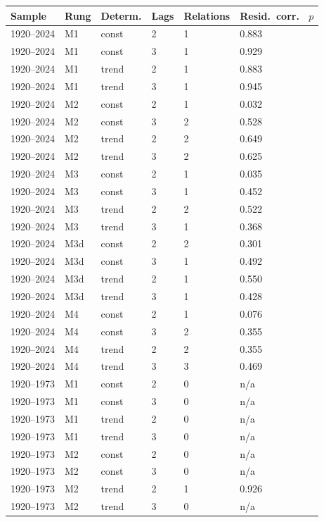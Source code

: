 \documentclass[11pt]{article}
\begin{document}
\footnotesize
\begin{longtable}{p{2.6cm}p{1.6cm}p{1.8cm}p{1.2cm}p{2.2cm}p{3.0cm}}
\toprule
\textbf{Sample} & \textbf{Rung} & \textbf{Determ.} & \textbf{Lags} & \textbf{Relations} & \textbf{Resid.\ corr.\ } $p$ \\
\midrule
\endhead
1920--2024 & M1 & const & 2 & 1 & 0.883 \\
1920--2024 & M1 & const & 3 & 1 & 0.929 \\
1920--2024 & M1 & trend & 2 & 1 & 0.883 \\
1920--2024 & M1 & trend & 3 & 1 & 0.945 \\
1920--2024 & M2 & const & 2 & 1 & 0.032 \\
1920--2024 & M2 & const & 3 & 2 & 0.528 \\
1920--2024 & M2 & trend & 2 & 2 & 0.649 \\
1920--2024 & M2 & trend & 3 & 2 & 0.625 \\
1920--2024 & M3 & const & 2 & 1 & 0.035 \\
1920--2024 & M3 & const & 3 & 1 & 0.452 \\
1920--2024 & M3 & trend & 2 & 2 & 0.522 \\
1920--2024 & M3 & trend & 3 & 1 & 0.368 \\
1920--2024 & M3d & const & 2 & 2 & 0.301 \\
1920--2024 & M3d & const & 3 & 1 & 0.492 \\
1920--2024 & M3d & trend & 2 & 1 & 0.550 \\
1920--2024 & M3d & trend & 3 & 1 & 0.428 \\
1920--2024 & M4 & const & 2 & 1 & 0.076 \\
1920--2024 & M4 & const & 3 & 2 & 0.355 \\
1920--2024 & M4 & trend & 2 & 2 & 0.355 \\
1920--2024 & M4 & trend & 3 & 3 & 0.469 \\
1920--1973 & M1 & const & 2 & 0 & n/a \\
1920--1973 & M1 & const & 3 & 0 & n/a \\
1920--1973 & M1 & trend & 2 & 0 & n/a \\
1920--1973 & M1 & trend & 3 & 0 & n/a \\
1920--1973 & M2 & const & 2 & 0 & n/a \\
1920--1973 & M2 & const & 3 & 0 & n/a \\
1920--1973 & M2 & trend & 2 & 1 & 0.926 \\
1920--1973 & M2 & trend & 3 & 0 & n/a \\

\end{longtable}
\end{document}
